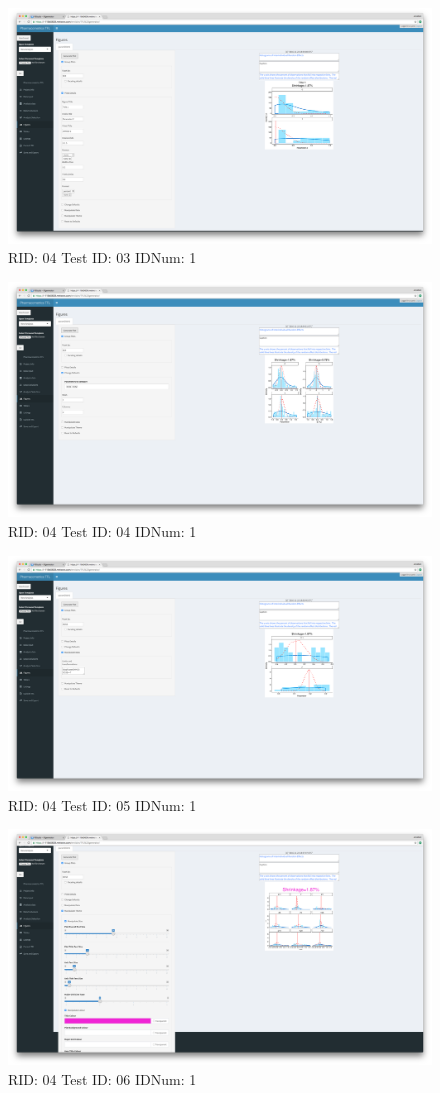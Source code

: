 \begin{figure}[H]
\includegraphics[width=.8\textwidth]{screencaps/04-03-1.png}
\caption{RID: 04 Test ID: 03 IDNum: 1}
\end{figure}
\begin{figure}[H]
\includegraphics[width=.8\textwidth]{screencaps/04-04-1.png}
\caption{RID: 04 Test ID: 04 IDNum: 1}
\end{figure}
\begin{figure}[H]
\includegraphics[width=.8\textwidth]{screencaps/04-05-1.png}
\caption{RID: 04 Test ID: 05 IDNum: 1}
\end{figure}
\begin{figure}[H]
\includegraphics[width=.8\textwidth]{screencaps/04-06-1.png}
\caption{RID: 04 Test ID: 06 IDNum: 1}
\end{figure}
